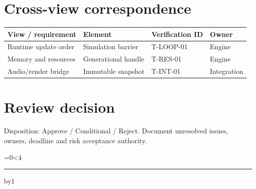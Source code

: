 \documentclass[11pt,letterpaper]{article}
\newcommand{\WriteLines}[1]{\par\begingroup\setlength{\parskip}{9pt}\count255=0\loop\ifnum\count255<#1\noindent\rule{\linewidth}{0.35pt}\par\advance\count255 by1\repeat\endgroup\smallskip}
\begin{document}
\section{Cross-view correspondence}
\small\begin{longtable}{|p{\dimexpr(\linewidth-8\tabcolsep-5\arrayrulewidth-1pt)/4\relax}|p{\dimexpr(\linewidth-8\tabcolsep-5\arrayrulewidth-1pt)/4\relax}|p{\dimexpr(\linewidth-8\tabcolsep-5\arrayrulewidth-1pt)/4\relax}|p{\dimexpr(\linewidth-8\tabcolsep-5\arrayrulewidth-1pt)/4\relax}|}
\hline \textbf{View / requirement} & \textbf{Element} & \textbf{Verification ID} & \textbf{Owner}\\ \hline\endhead
Runtime update order & Simulation barrier & T-LOOP-01 & Engine\\ \hline
Memory and resources & Generational handle & T-RES-01 & Engine\\ \hline
Audio/render bridge & Immutable snapshot & T-INT-01 & Integration\\ \hline
\end{longtable}\normalsize
\section{Review decision}
Disposition: Approve / Conditional / Reject. Document unresolved issues, owners, deadline and risk acceptance authority.

\WriteLines{4}
\end{document}
